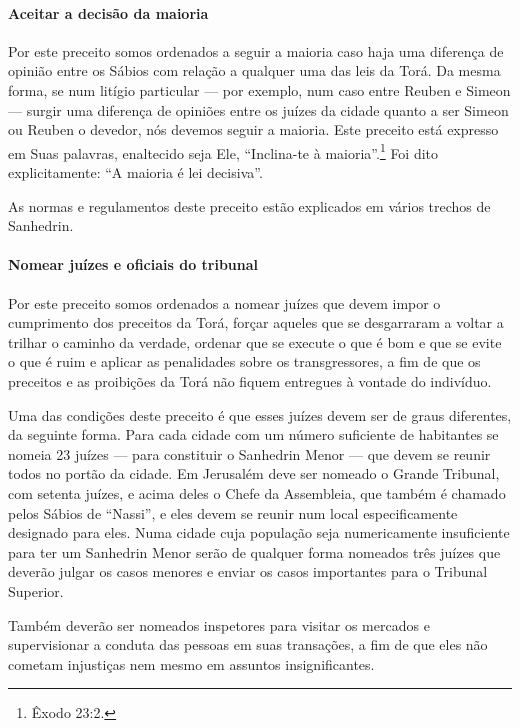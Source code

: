 \paragraph{Aceitar a decisão da maioria}

Por este preceito somos ordenados a seguir a maioria caso haja uma
diferença de opinião entre os Sábios com relação a qualquer uma das leis
da Torá. Da mesma forma, se num litígio particular --- por exemplo, num
caso entre Reuben e Simeon --- surgir uma diferença de opiniões entre os
juízes da cidade quanto a ser Simeon ou Reuben o devedor, nós devemos
seguir a maioria. Este preceito está expresso em Suas palavras,
enaltecido seja Ele, ``Inclina-te à maioria''.\footnote{Êxodo 23:2.} Foi dito
explicitamente: ``A maioria é lei decisiva''.

As normas e regulamentos deste preceito estão explicados em vários
trechos de Sanhedrin.

\paragraph{Nomear juízes e oficiais do tribunal}

Por este preceito somos ordenados a nomear juízes que devem impor o
cumprimento dos preceitos da Torá, forçar aqueles que se desgarraram a
voltar a trilhar o caminho da verdade, ordenar que se execute o que é
bom e que se evite o que é ruim e aplicar as penalidades sobre os
transgressores, a fim de que os preceitos e as proibições da Torá não
fiquem entregues à vontade do indivíduo.

Uma das condições deste preceito é que esses juízes devem ser de graus
diferentes, da seguinte forma. Para cada cidade com um número
suficiente de habitantes se nomeia 23 juízes --- para constituir o
Sanhedrin Menor --- que devem se reunir todos no portão da cidade. Em
Jerusalém deve ser nomeado o Grande Tribunal, com setenta juízes, e
acima deles o Chefe da Assembleia, que também é chamado pelos Sábios de
``Nassi'', e eles devem se reunir num local especificamente designado
para eles. Numa cidade cuja população seja numericamente insuficiente
para ter um Sanhedrin Menor serão de qualquer forma nomeados três
juízes que deverão julgar os casos menores e enviar os casos importantes
para o Tribunal Superior.

Também deverão ser nomeados inspetores para visitar os mercados e
supervisionar a conduta das pessoas em suas transações, a fim de que
eles não cometam injustiças nem mesmo em assuntos insignificantes.

